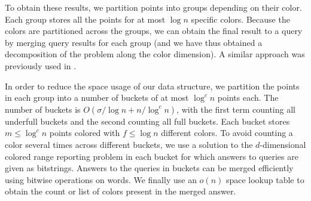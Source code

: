 To obtain these results, we partition points into groups depending on their color. Each group stores all the points for at most $\log n$ specific colors. Because the colors are partitioned across the groups, we can obtain the final result to a query by merging query results for each group (and we have thus obtained a decomposition of the problem along the color dimension). A similar approach was previously used in \cite{kaplan2007counting}.

In order to reduce the space usage of our data structure, we partition the points in each group into a number of buckets of at most $\log^c n$ points each. The number of buckets is $O(\sigma / \log n + n / \log ^c n)$, with the first term counting all underfull buckets and the second counting all full buckets. Each bucket stores $m \leq \log ^c n$ points colored with $f \leq \log n$ different colors.
To avoid counting a color several times across different buckets, we use a solution to the $d$-dimensional colored range reporting problem in each bucket for which answers to queries are given as bitstrings. Answers to the queries in buckets can be merged efficiently using bitwise operations on words.
We finally use an $o(n)$ space lookup table to obtain the count or list of colors present in the merged answer. 

